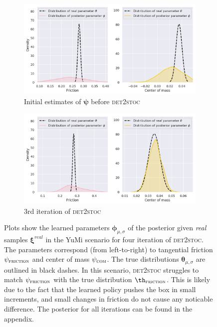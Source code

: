 \documentclass{kththesis}
\newcommand{\vth}{\boldsymbol{\theta}}
\newcommand{\vph}{\boldsymbol{\phi}}
\newcommand{\vpsi}{\vec{\psi}}
\renewcommand{\vec}[1]{\boldsymbol{#1}}
\newcommand{\dettostoc}{\textsc{det2stoc}}
\newcommand{\pfriction}{\psi_{\textsc{friction}}}
\newcommand{\pcom}{\psi_{\textsc{com}}}
\begin{document}
\begin{figure}
\centering
\captionsetup{size=footnotesize}
\begin{subfigure}{\textwidth}
  \includegraphics[width=\textwidth]{img/yumi/latent-representation/yumi_latent_encoding_0_iter}%
  \caption{Initial estimates of $\vpsi$ before \dettostoc{}}
\end{subfigure}
\begin{subfigure}{\textwidth}
  \centering
  \includegraphics[width=\linewidth]{img/yumi/latent-representation/yumi_latent_encoding_3_iter}
  \caption{3rd iteration of \dettostoc{}}
\end{subfigure}
\caption{Plots show the learned parameters $\vph_{\mu, \sigma}$ of the posterior given \emph{real} samples $\vec{\xi}^{real}$ in the YuMi scenario for four iteration of \dettostoc{}.
The parameters correspond (from left-to-right) to tangential friction $\pfriction$ and center of mass $\pcom$. The true distributions $\vth_{\mu, \sigma}$ are outlined in black dashes. In this scenario, \dettostoc{} struggles to match $\pfriction{}$ with the true distribution $\th_\textsc{friction}$. This is likely due to the fact that the learned policy pushes the box in small increments, and small changes in friction do not cause any noticable difference. The posterior for all iterations can be found in the appendix.}
\label{fig:yumi/latentspace}
\end{figure}
\end{document}
